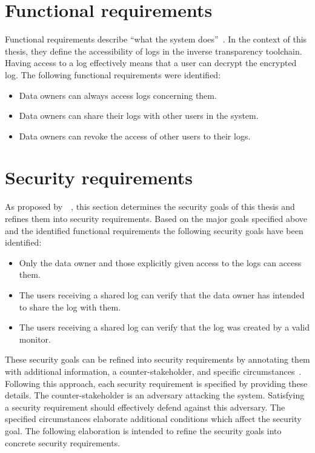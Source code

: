 \documentclass[../main.tex]{subfiles}
\begin{document}
\section{Functional requirements}\label{functional-requriements}
Functional requirements describe \enquote{what the system does}~\cite[11]{Mylopoulos1992}.
In the context of this thesis, they define the accessibility of logs in the inverse transparency toolchain.
Having access to a log effectively means that a user can decrypt the encrypted log.
The following functional requirements were identified:
\begin{itemize}
    \item Data owners can always access logs concerning them.
    \item Data owners can share their logs with other users in the system.
    \item Data owners can revoke the access of other users to their logs.
\end{itemize}

\section{Security requirements}\label{security-requriements}
As proposed by~\citeauthor{Fabian2010}~\cite{Fabian2010}, this section determines the security goals of this thesis and refines them into security requirements.
Based on the major goals specified above and the identified functional requirements the following security goals have been identified:
\begin{itemize}
    \item Only the data owner and those explicitly given access to the logs can access them.
    \item The users receiving a shared log can verify that the data owner has intended to share the log with them.
    \item The users receiving a shared log can verify that the log was created by a valid monitor.
\end{itemize}

These security goals can be refined into security requirements by annotating them with additional information, a counter-stakeholder, and specific circumstances~\cite{Fabian2010}.
Following this approach, each security requirement is specified by providing these details.
The counter-stakeholder is an adversary attacking the system.
Satisfying a security requirement should effectively defend against this adversary.
The specified circumstances elaborate additional conditions which affect the security goal.
The following elaboration is intended to refine the security goals into concrete security requirements.
\end{document}
